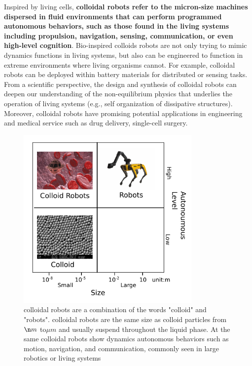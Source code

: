 Inspired by living cells, \textbf{colloidal robots refer to the micron-size machines  dispersed in fluid environments that can perform  programmed autonomous behaviors, such as those found in the living systems including propulsion, navigation, sensing, communication, or even high-level cognition}. Bio-inspired colloids robots are not only trying to mimic dynamics functions in living systems, but also can be engineered to function in extreme environments where living organisms cannot. For example, colloidal robots can be deployed within battery materials for distributed or sensing tasks. From a scientific perspective, the design and synthesis of colloidal robots can deepen our understanding of the non-equilibrium physics that underlies the operation of living systems (e.g., self organization of dissipative structures). Moreover, colloidal robots have promising potential applications in engineering and medical service such as drug delivery\autocite{fu2012controlled,de2017micromotor}, single-cell surgery\autocite{li2017micro}. 

\begin{figure}
\centering
\includegraphics[width=9cm]{figures/1_1.pdf}
\caption{colloidal robots are a combination of the words "colloid" and "robots". colloidal robots are the same size as colloid particles from $\n m$ to$\mu m$ and usually suspend throughout the liquid phase. At the same colloidal robots show dynamics autonomous behaviors such as motion, navigation, and communication, commonly seen in large robotics or living systems}
\label{fig:1.1}
\end{figure}



